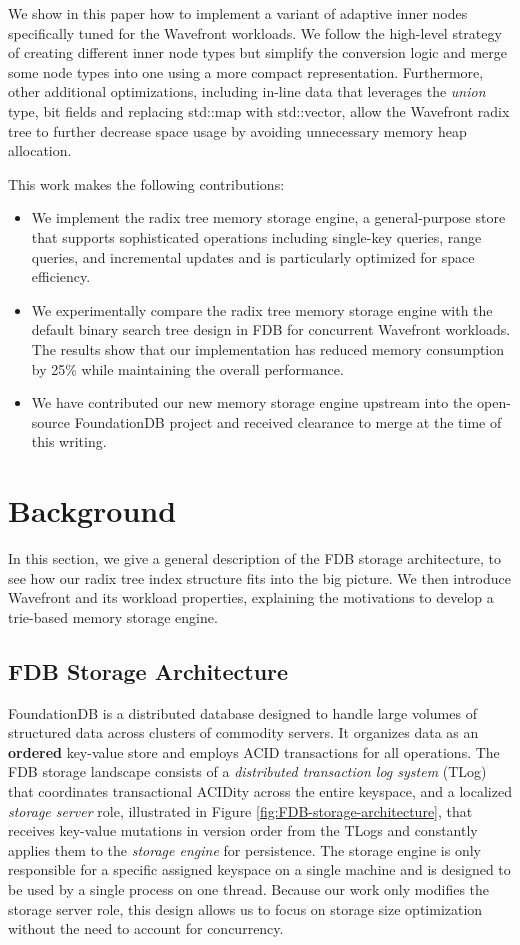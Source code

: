 \documentclass[sigplan,screen,nonacm]{acmart}
\begin{document}
We show in this paper how to implement a variant of adaptive inner nodes specifically tuned for the Wavefront workloads. We follow the high-level strategy of creating different inner node types but simplify the conversion logic and merge some node types into one using a more compact representation. Furthermore, other additional optimizations, including in-line data that leverages the {\itshape union} type, bit fields  \cite{oualline1997practical} and replacing std::map with std::vector, allow the Wavefront radix tree to further decrease space usage by avoiding unnecessary memory heap allocation. 

This work makes the following contributions:
\begin{itemize}
\item We implement the radix tree memory storage engine, a general-purpose store that supports sophisticated operations including single-key queries, range queries, and incremental updates and is particularly optimized for space efficiency. 
\item We experimentally compare the radix tree memory storage engine with the default binary search tree design in FDB for concurrent Wavefront workloads. The results show that our implementation has reduced memory consumption by 25\% while maintaining the overall performance. 
\item We have contributed our new memory storage engine upstream into the open-source FoundationDB project \cite{theGithubUrl} and received clearance to merge at the time of this writing.
\end{itemize}

\section{Background}
In this section, we give a general description of the FDB storage architecture, to see how our radix tree index structure fits into the big picture. We then introduce Wavefront and its workload properties, explaining the motivations to develop a trie-based memory storage engine. 

\subsection{FDB Storage Architecture}
FoundationDB \cite{fdb} is a distributed database designed to handle large volumes of structured data across clusters of commodity servers. It organizes data as an \textbf{ordered} key-value store and employs ACID transactions for all operations.  The FDB storage landscape consists of a {\itshape distributed transaction log system} (TLog) that coordinates transactional ACIDity across the entire keyspace, and a localized {\itshape storage server} role, illustrated in Figure \ref{fig:FDB-storage-architecture}, that receives key-value mutations in version order from the TLogs and constantly applies them to the {\itshape storage engine} for persistence.  The storage engine is only responsible for a specific assigned keyspace on a single machine and is designed to be used by a single process on one thread.  Because our work only modifies the storage server role, this design allows us to focus on storage size optimization without the need to account for concurrency.
\end{document}
